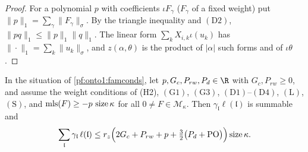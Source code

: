 \begin{proof}
For a polynomial $p$ with coefficients $\iota F_\gamma$ ($F_\gamma$ of a fixed weight) put $\|p\|_1=\sum_\gamma\|F_\gamma\|_\sigma$. By
the triangle inequality and $(\mathrm D2)$, $\|pq\|_1\le\|p\|_1\|q\|_1$. The linear form $\sum_kX_{i,k}\iota(u_k)$ has
$\|\cdot\|_1=\sum_k\|u_k\|_\sigma$, and $z(\alpha,\theta)$ is the product of $|\alpha|$ such forms and of $\iota\theta$.
\end{proof}

\begin{theorem}\label{pf:onto1:deepC}
In the situation of \cref{pf:onto1:famconds}, let $p,G_c,P_{rw},P_d\in\R$ with $G_c,P_{rw}\ge0$, and assume the weight conditions
of (H2), $(\mathrm G1)$, $(\mathrm G3)$, $(\mathrm D1)$--$(\mathrm D4)$, $(\mathrm L)$, $(\mathrm S)$, and
$\operatorname{mls}(F)\ge-p\,\operatorname{size}\kappa$ for all $0\ne F\in\mathcal M_\kappa$. Then $\gamma_{\mathfrak l}\ell(\mathfrak l)$ is summable and
\[
\sum_{\mathfrak l}\gamma_{\mathfrak l}\,\ell(\mathfrak l)\le r_z\Bigl(2G_c+P_{rw}+p+\tfrac32\bigl(P_d+\mathrm{PO}\bigr)\Bigr)\operatorname{size}\kappa .
\]
\end{theorem}

